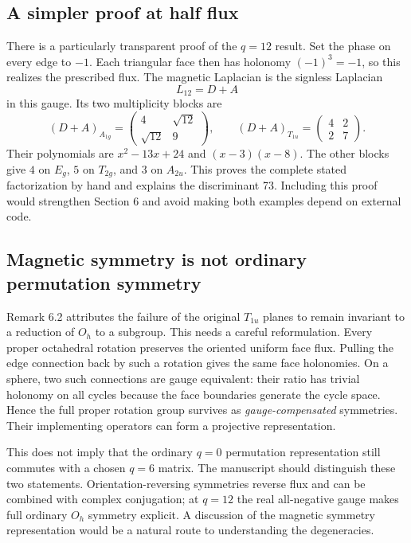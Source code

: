 \documentclass[11pt,a4paper]{article}
\begin{document}
\subsection*{A simpler proof at half flux}
There is a particularly transparent proof of the $q=12$ result. Set the phase on every edge to $-1$. Each triangular face then has holonomy $(-1)^3=-1$, so this realizes the prescribed flux. The magnetic Laplacian is the signless Laplacian
\[
 L_{12}=D+A
\]
in this gauge. Its two multiplicity blocks are
\[
 (D+A)_{A_{1g}}=\begin{pmatrix}4&\sqrt{12}\\\sqrt{12}&9\end{pmatrix},
 \qquad
 (D+A)_{T_{1u}}=\begin{pmatrix}4&2\\2&7\end{pmatrix}.
\]
Their polynomials are $x^2-13x+24$ and $(x-3)(x-8)$. The other blocks give $4$ on $E_g$, $5$ on $T_{2g}$, and $3$ on $A_{2u}$. This proves the complete stated factorization by hand and explains the discriminant 73. Including this proof would strengthen Section 6 and avoid making both examples depend on external code.

\subsection*{Magnetic symmetry is not ordinary permutation symmetry}
Remark 6.2 attributes the failure of the original $T_{1u}$ planes to remain invariant to a reduction of $O_h$ to a subgroup. This needs a careful reformulation. Every proper octahedral rotation preserves the oriented uniform face flux. Pulling the edge connection back by such a rotation gives the same face holonomies. On a sphere, two such connections are gauge equivalent: their ratio has trivial holonomy on all cycles because the face boundaries generate the cycle space. Hence the full proper rotation group survives as \emph{gauge-compensated} symmetries. Their implementing operators can form a projective representation.

This does not imply that the ordinary $q=0$ permutation representation still commutes with a chosen $q=6$ matrix. The manuscript should distinguish these two statements. Orientation-reversing symmetries reverse flux and can be combined with complex conjugation; at $q=12$ the real all-negative gauge makes full ordinary $O_h$ symmetry explicit. A discussion of the magnetic symmetry representation would be a natural route to understanding the degeneracies.
\end{document}
